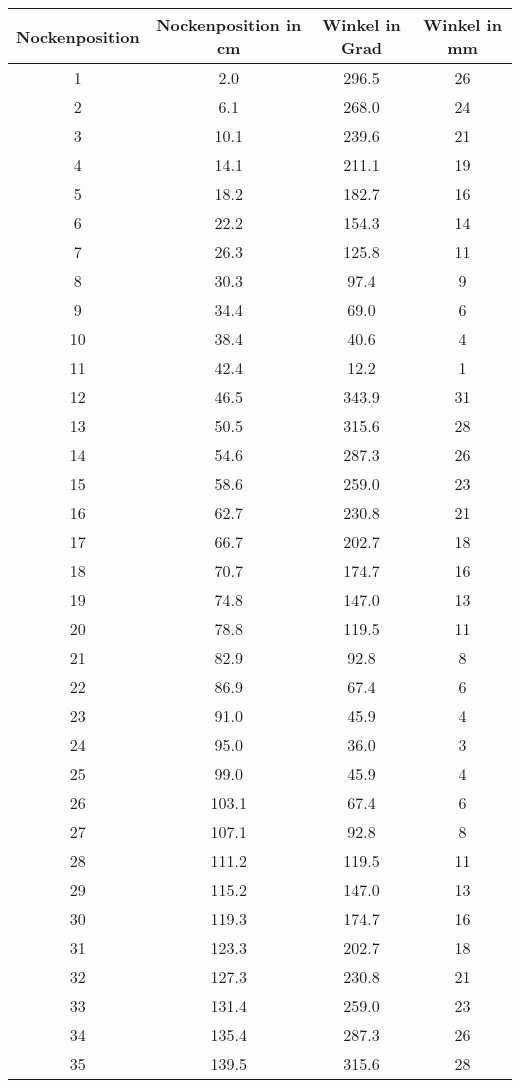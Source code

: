 \documentclass[10pt, a4paper]{article}
\begin{document}
\begin{center}
	\begin{tabular}{c|c|c|c}
		Nockenposition & Nockenposition in cm & Winkel in Grad & Winkel in mm \\
		\hline
		1 & 2.0 & 296.5 & 26 \\
		2 & 6.1 & 268.0 & 24 \\
		3 & 10.1 & 239.6 & 21 \\
		4 & 14.1 & 211.1 & 19 \\
		5 & 18.2 & 182.7 & 16 \\
		6 & 22.2 & 154.3 & 14 \\
		7 & 26.3 & 125.8 & 11 \\
		8 & 30.3 & 97.4 & 9 \\
		9 & 34.4 & 69.0 & 6 \\
		10 & 38.4 & 40.6 & 4 \\
		11 & 42.4 & 12.2 & 1 \\
		12 & 46.5 & 343.9 & 31 \\
		13 & 50.5 & 315.6 & 28 \\
		14 & 54.6 & 287.3 & 26 \\
		15 & 58.6 & 259.0 & 23 \\
		16 & 62.7 & 230.8 & 21 \\
		17 & 66.7 & 202.7 & 18 \\
		18 & 70.7 & 174.7 & 16 \\
		19 & 74.8 & 147.0 & 13 \\
		20 & 78.8 & 119.5 & 11 \\
		21 & 82.9 & 92.8 & 8 \\
		22 & 86.9 & 67.4 & 6 \\
		23 & 91.0 & 45.9 & 4 \\
		24 & 95.0 & 36.0 & 3 \\
		25 & 99.0 & 45.9 & 4 \\
		26 & 103.1 & 67.4 & 6 \\
		27 & 107.1 & 92.8 & 8 \\
		28 & 111.2 & 119.5 & 11 \\
		29 & 115.2 & 147.0 & 13 \\
		30 & 119.3 & 174.7 & 16 \\
		31 & 123.3 & 202.7 & 18 \\
		32 & 127.3 & 230.8 & 21 \\
		33 & 131.4 & 259.0 & 23 \\
		34 & 135.4 & 287.3 & 26 \\
		35 & 139.5 & 315.6 & 28 \\

\end{tabular}
\end{center}
\end{document}
